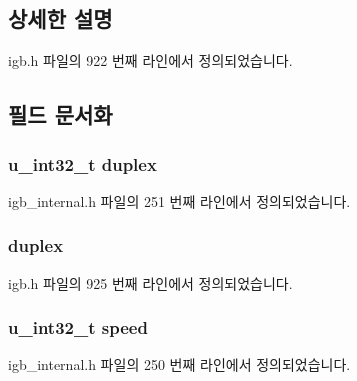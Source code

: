 \subsection{상세한 설명}


igb.\+h 파일의 922 번째 라인에서 정의되었습니다.



\subsection{필드 문서화}
\subsubsection[{\texorpdfstring{duplex}{duplex}}]{\setlength{\rightskip}{0pt plus 5cm}u\+\_\+int32\+\_\+t duplex}\hypertarget{structigb__link__cmd_ab56d31f9dbd9fd2ae5bfbd505bd2fcc2}{}\label{structigb__link__cmd_ab56d31f9dbd9fd2ae5bfbd505bd2fcc2}


igb\+\_\+internal.\+h 파일의 251 번째 라인에서 정의되었습니다.

\subsubsection[{\texorpdfstring{duplex}{duplex}}]{ duplex}\hypertarget{structigb__link__cmd_ab97627644bbfa45fd434e6f2493c8918}{}\label{structigb__link__cmd_ab97627644bbfa45fd434e6f2493c8918}


igb.\+h 파일의 925 번째 라인에서 정의되었습니다.

\subsubsection[{\texorpdfstring{speed}{speed}}]{\setlength{\rightskip}{0pt plus 5cm}u\+\_\+int32\+\_\+t speed}\hypertarget{structigb__link__cmd_a124bfff52717ca85e31ddfe15426204d}{}\label{structigb__link__cmd_a124bfff52717ca85e31ddfe15426204d}


igb\+\_\+internal.\+h 파일의 250 번째 라인에서 정의되었습니다.

